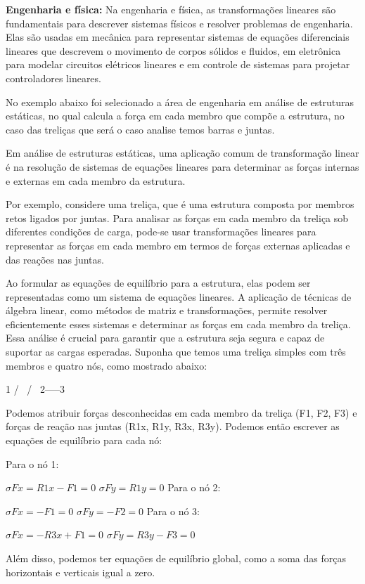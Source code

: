 \textbf{Engenharia e física:} Na engenharia e física, as transformações lineares são fundamentais para descrever sistemas físicos e resolver problemas de engenharia. Elas são usadas em mecânica para representar sistemas de equações diferenciais lineares que descrevem o movimento de corpos sólidos e fluidos, em eletrônica para modelar circuitos elétricos lineares e em controle de sistemas para projetar controladores lineares.

No exemplo abaixo foi selecionado a área de engenharia em análise de estruturas estáticas, no qual calcula a força em cada membro que compõe a estrutura, no caso das treliças que será o caso analise temos barras e juntas.
 
Em análise de estruturas estáticas, uma aplicação comum de transformação linear é na resolução de sistemas de equações lineares para determinar as forças internas e externas em cada membro da estrutura.

Por exemplo, considere uma treliça, que é uma estrutura composta por membros retos ligados por juntas. Para analisar as forças em cada membro da treliça sob diferentes condições de carga, pode-se usar transformações lineares para representar as forças em cada membro em termos de forças externas aplicadas e das reações nas juntas.
 
Ao formular as equações de equilíbrio para a estrutura, elas podem ser representadas como um sistema de equações lineares. A aplicação de técnicas de álgebra linear, como métodos de matriz e transformações, permite resolver eficientemente esses sistemas e determinar as forças em cada membro da treliça. Essa análise é crucial para garantir que a estrutura seja segura e capaz de suportar as cargas esperadas.
	Suponha que temos uma treliça simples com três membros e quatro nós, como mostrado abaixo:

   1
  / \
 /   \
2-----3

Podemos atribuir forças desconhecidas em cada membro da treliça (F1, F2, F3) e forças de reação nas juntas (R1x, R1y, R3x, R3y). Podemos então escrever as equações de equilíbrio para cada nó:

Para o nó 1:

$\sigma Fx = R1x - F1 = 0$
$\sigma Fy = R1y = 0$
Para o nó 2:

$\sigma Fx = -F1 = 0$
$\sigma Fy = -F2 = 0$
Para o nó 3:

$\sigma Fx = -R3x + F1 = 0$
$\sigma Fy = R3y - F3 = 0$

Além disso, podemos ter equações de equilíbrio global, como a soma das forças horizontais e verticais igual a zero.

